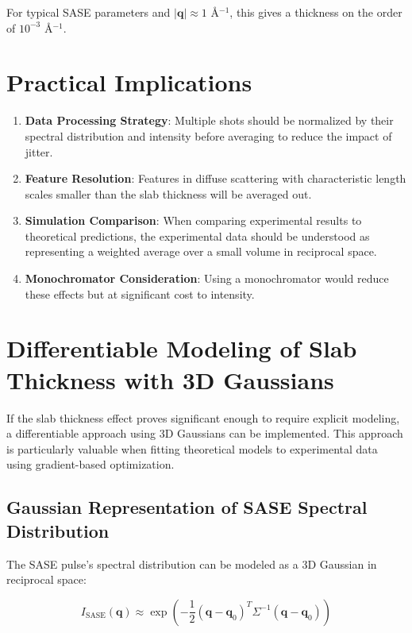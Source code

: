 \documentclass[12pt,a4paper]{article}
\begin{document}
For typical SASE parameters and $|\mathbf{q}| \approx 1$ \AA{}$^{-1}$, this gives a thickness on the order of $10^{-3}$ \AA{}$^{-1}$.

\section{Practical Implications}

\begin{enumerate}
\item \textbf{Data Processing Strategy}: Multiple shots should be normalized by their spectral distribution and intensity before averaging to reduce the impact of jitter.

\item \textbf{Feature Resolution}: Features in diffuse scattering with characteristic length scales smaller than the slab thickness will be averaged out.

\item \textbf{Simulation Comparison}: When comparing experimental results to theoretical predictions, the experimental data should be understood as representing a weighted average over a small volume in reciprocal space.

\item \textbf{Monochromator Consideration}: Using a monochromator would reduce these effects but at significant cost to intensity.
\end{enumerate}

\section{Differentiable Modeling of Slab Thickness with 3D Gaussians}

If the slab thickness effect proves significant enough to require explicit modeling, a differentiable approach using 3D Gaussians can be implemented. This approach is particularly valuable when fitting theoretical models to experimental data using gradient-based optimization.

\subsection{Gaussian Representation of SASE Spectral Distribution}

The SASE pulse's spectral distribution can be modeled as a 3D Gaussian in reciprocal space:

\begin{equation}
I_{\text{SASE}}(\mathbf{q}) \approx \exp\left(-\frac{1}{2}(\mathbf{q} - \mathbf{q}_0)^T \Sigma^{-1} (\mathbf{q} - \mathbf{q}_0)\right)
\end{equation}
\end{document}
